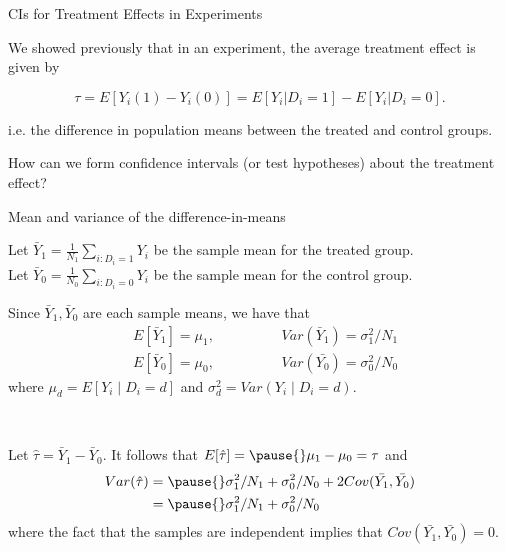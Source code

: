 \documentclass[11pt,english,handout]{beamer}
\newenvironment{wideitemize}{\itemize\addtolength{\itemsep}{10pt}}{\enditemize}
\begin{document}
\begin{frame}{CIs for Treatment Effects in Experiments}
	
	\begin{wideitemize}
		\item
		We showed previously that in an experiment, the average treatment effect is given by 
		
		$$\tau = E[Y_i(1) - Y_i(0)] = E[Y_i | D_i = 1] - E[Y_i | D_i = 0].$$
		
		i.e. the difference in population means between the treated and control groups.
		\pause
		\item
		How can we form confidence intervals (or test hypotheses) about the treatment effect? 
						
	\end{wideitemize}
	
\end{frame}

\begin{frame}{Mean and variance of the difference-in-means}
\begin{wideitemize}
			\item
			Let $\bar{Y}_1 = \frac{1}{N_1} \sum_{i: D_i = 1}  Y_i $ be the sample mean for the treated group. \\
			Let $\bar{Y}_0 = \frac{1}{N_0} \sum_{i: D_i = 0}  Y_i $ be the sample mean for the control group. 
			
			\pause 
			\item
			Since $\bar{Y}_1,\bar{Y}_0$ are each sample means, we have that \pause 
			\begin{align*}
			& E[\bar{Y}_1] = \mu_1, \hspace{2cm} Var(\bar{Y}_1) = \sigma_1^2 / N_1 \\
			& E[\bar{Y}_0] = \mu_0, \hspace{2cm} Var(\bar{Y_0}) = \sigma_0^2 / N_0 
			\end{align*} 
		\noindent where $\mu_d = E[Y_i \mid D_i=d]$ and $\sigma_d^2 = Var(Y_i \mid D_i = d)$.
		
		\
		
			\item
			Let $\hat\tau= \bar{Y}_1 - \bar{Y}_0$. It follows that $E[\hat\tau] = \pause{}\mu_1 - \mu_0 = \tau$ and
			\begin{align*}
			Var( \hat\tau ) &=  \pause{} \sigma_1^2 / N_1 +  \sigma_0^2 / N_0 + 2 Cov(\bar{Y_1}, \bar{Y_0})\\
			& = \pause{}\sigma_1^2 / N_1 +  \sigma_0^2 / N_0 
					\end{align*}
			\noindent where the fact that the samples are independent implies that $Cov(\bar{Y_1}, \bar{Y_0}) = 0$.
\end{wideitemize}
\end{frame}
\end{document}
